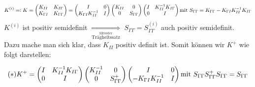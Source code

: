 \[
  K^{(i)}=:K=
  \begin{pmatrix}
    K_{II}& K_{I\Gamma}\\
    K_{\Gamma I}& K_{\Gamma\Gamma}
  \end{pmatrix}
  =
  \begin{pmatrix}
    I& 0\\
    K_{\Gamma I} K_{II}^{-1}& I
  \end{pmatrix}
  \begin{pmatrix}
    K_{II}& 0\\
    0& S_{\Gamma\Gamma}
  \end{pmatrix}
  \begin{pmatrix}
    I& K_{II}^{-1}K_{I\Gamma}\\
    0& I
  \end{pmatrix}\\
  \text{mit } S_{\Gamma\Gamma}=K_{\Gamma\Gamma}-K_{\Gamma I}K_{II}^{-1}K_{I\Gamma}
\]
$K^{(i)}$ ist positiv semidefinit $\underset{\overset{\text{Silvester}}{\text{Trägheitssatz}}}{\Longrightarrow}$ $S_{\Gamma\Gamma}=S_{\Gamma\Gamma}^{(i)}$ auch positiv semidefinit. Dazu mache man sich klar, dass $K_{II}$ positiv definit ist. Somit können wir $K^+$ wie folgt darstellen:

\[
  (*) K^+ = 
  \begin{pmatrix}
    I& K_{II}^{-1}K_{I\Gamma}\\
    0& I
  \end{pmatrix}
  \begin{pmatrix}
    K_{II}^{-1}& 0\\
    0& S_{\Gamma\Gamma}^+
  \end{pmatrix}
  \begin{pmatrix}
    I& 0\\
    -K_{\Gamma I}K_{II}^{-1}& I
  \end{pmatrix}\\
  \text{mit } S_{\Gamma\Gamma}S_{\Gamma\Gamma}^+S_{\Gamma\Gamma}=S_{\Gamma\Gamma}
\]


